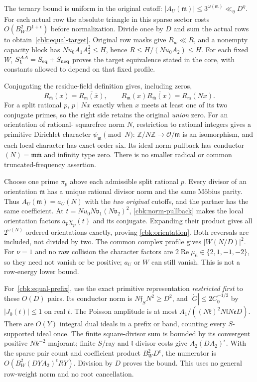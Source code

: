 The ternary bound is uniform in the original cutoff:
$|A_U(\mathfrak m)|\le3^{\omega(\mathfrak m)}\ll_\eta D^\eta$.
For each actual row the absolute triangle in this sparse sector
costs $O(B_W^2D^{1+\epsilon})$ before normalization. Divide once
by $D$ and sum the actual rows to obtain~\eqref{cbk:equal-target}.
Original row masks give $R_w\ll R$, and a nonempty capacity block
has $Nu_0A_1A_2^2\le H$, hence $R\le H/(Nu_0A_2)\le H$.
For each fixed $W$, $S_1^{AA}=S_{\rm eq}+S_{\rm neq}$ proves the
target equivalence stated in the core, with constants allowed to
depend on that fixed profile.

Conjugating the residue-field definition gives, including zeros,
\begin{equation}\label{cbk:norm-pullback}
 R_{\bar{\mathfrak m}}(x)=\overline{R_{\mathfrak m}(\bar x)},\qquad
 R_{\mathfrak m}(x)\overline{R_{\bar{\mathfrak m}}(x)}
                                  =R_{\mathfrak m}(Nx).
\end{equation}
For a split rational $p$, $p\mid Nx$ exactly when $x$ meets at
least one of its two conjugate primes, so the right side retains
the original \emph{union} zero. For an orientation of rational-
squarefree norm $N$, restriction to rational integers gives a
primitive Dirichlet character $\psi_{\mathfrak m}\pmod N$:
$\mathbb Z/N\mathbb Z\longrightarrow\mathcal O/\mathfrak m$ is an
isomorphism, and each local character has exact order six.
Its ideal norm pullback has conductor
$(N)=\mathfrak m\bar{\mathfrak m}$ and infinity type zero.
There is no smaller radical or common truncated-frequency assertion.

Choose one prime $\pi_p$ above each admissible split rational $p$.
Every divisor of an orientation $\mathfrak m$ has a unique rational
divisor norm and the same M\"obius parity. Thus
$A_U(\mathfrak m)=a_U(N)$ with the \emph{two original} cutoffs, and
the partner has the same coefficient. At
$t=Nu_0N\mathfrak v_1(N\mathfrak v_2)^2$,
\eqref{cbk:norm-pullback} makes the local orientation factors
$a_p\chi_p(t)$ and its conjugate. Expanding their product gives
all $2^{\omega(N)}$ ordered orientations exactly, proving
\eqref{cbk:orientation}. Both reversals are included, not divided
by two. The common complex profile gives $|W(N/D)|^2$.
For $\nu=1$ and no raw collision the character factors are
$2\operatorname{Re}\mu_6\in\{2,1,-1,-2\}$, so they need not
vanish or be positive; $a_U$ or $W$ can still vanish. This is not
a row-energy lower bound.

For~\eqref{cbk:equal-prefix}, use the exact primitive representation
\emph{restricted first} to these $O(D)$ pairs. Its conductor norm
is $N\mathfrak f_S N^2\ge D^2$, and $|\dot G|\le2C_0^{-1/2}$
by $|J_0(t)|\le1$ on real $t$. The Poisson amplitude is at most
$A_1/((N\mathfrak k)^2N\mathfrak lN\mathfrak eD)$.
There are $O(Y)$ integral dual ideals in a prefix or band, counting
every $S$-supported ideal once. The finite square-divisor sum is
bounded by its convergent positive $Nk^{-2}$ majorant; finite
$S$/ray and $\mathfrak l$ divisor costs give
$A_2(DA_2)^\epsilon$. With the sparse pair count and coefficient
product $B_W^2D^\epsilon$, the numerator is
$O(B_W^2(DYA_2)^\epsilon RY)$. Division by $D$ proves the bound.
This uses no general row-weight norm and no root cancellation.

